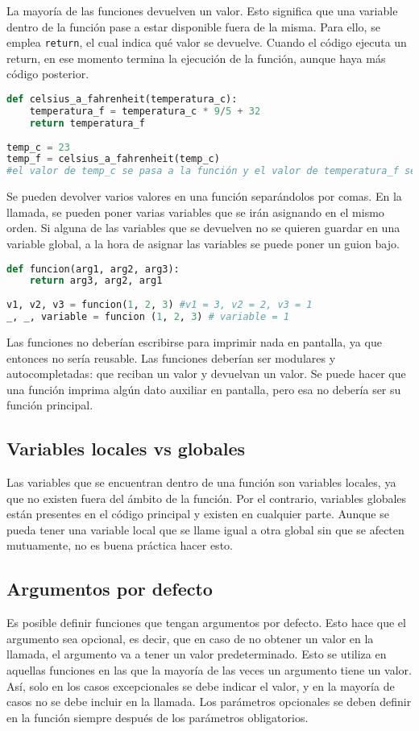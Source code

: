 La mayoría de las funciones devuelven un valor. Esto significa que una variable dentro de la función pase a estar disponible fuera de la misma. Para ello, se emplea \texttt{return}, el cual indica qué valor se devuelve. Cuando el código ejecuta un return, en ese momento termina la ejecución de la función, aunque haya más código posterior.
\begin{lstlisting}[language=Python]
def celsius_a_fahrenheit(temperatura_c):
	temperatura_f = temperatura_c * 9/5 + 32
	return temperatura_f
	
temp_c = 23
temp_f = celsius_a_fahrenheit(temp_c) 
#el valor de temp_c se pasa a la función y el valor de temperatura_f se le asigna a temp_f
\end{lstlisting}
Se pueden devolver varios valores en una función separándolos por comas. En la llamada, se pueden poner varias variables que se irán asignando en el mismo orden. Si alguna de las variables que se devuelven no se quieren guardar en una variable global, a la hora de asignar las variables se puede poner un guion bajo.
\begin{lstlisting}[language=Python]
def funcion(arg1, arg2, arg3):
	return arg3, arg2, arg1 
	
v1, v2, v3 = funcion(1, 2, 3) #v1 = 3, v2 = 2, v3 = 1
_, _, variable = funcion (1, 2, 3) # variable = 1
\end{lstlisting}
Las funciones no deberían escribirse para imprimir nada en pantalla, ya que entonces no sería reusable. Las funciones deberían ser modulares y autocompletadas: que reciban un valor y devuelvan un valor. Se puede hacer que una función imprima algún dato auxiliar en pantalla, pero esa no debería ser su función principal.

\subsection{Variables locales vs globales}
Las variables que se encuentran dentro de una función son variables locales, ya que no existen fuera del ámbito de la función. Por el contrario, variables globales están presentes en el código principal y existen en cualquier parte. Aunque se pueda tener una variable local que se llame igual a otra global sin que se afecten mutuamente, no es buena práctica hacer esto.

\subsection{Argumentos por defecto}
Es posible definir funciones que tengan argumentos por defecto. Esto hace que el argumento sea opcional, es decir, que en caso de no obtener un valor en la llamada, el argumento va a tener un valor predeterminado. Esto se utiliza en aquellas funciones en las que la mayoría de las veces un argumento tiene un valor. Así, solo en los casos excepcionales se debe indicar el valor, y en la mayoría de casos no se debe incluir en la llamada. Los parámetros opcionales se deben definir en la función siempre después de los parámetros obligatorios. 

